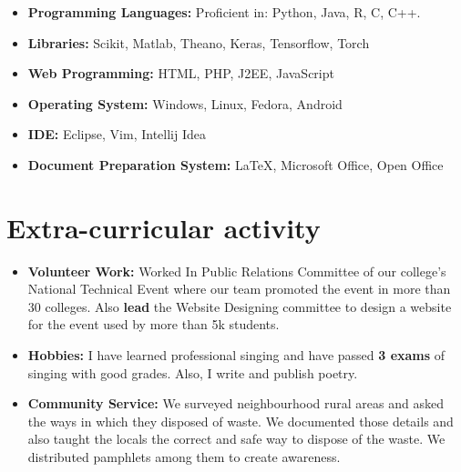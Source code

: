 \documentclass[11pt,a4paper,sans]{moderncv}        %
\begin{document}
\begin{itemize}

\item \textbf{Programming Languages:} Proficient in: Python, Java, R, C, C++.

\vspace{5pt}

\item \textbf{Libraries:} Scikit, Matlab, Theano, Keras, Tensorflow, Torch

\vspace{5pt}

\item \textbf{Web Programming:} HTML, PHP, J2EE, JavaScript

\vspace{5pt}

\item \textbf{Operating System:} Windows, Linux, Fedora, Android

\vspace{5pt}

\item \textbf{IDE:} Eclipse, Vim, Intellij Idea

\vspace{5pt}

\item \textbf{Document Preparation System:} LaTeX, Microsoft Office, Open Office

\end{itemize}

\section{Extra-curricular activity}

\vspace{5pt}

\begin{itemize}

\item\textbf{Volunteer Work:} Worked In Public Relations Committee of our college's National Technical Event where our team promoted the event in more than 30 colleges. Also \textbf{lead} the Website Designing committee to design a website for the event used by more than 5k students.

\vspace{5pt}

\item\textbf{Hobbies:} I have learned professional singing and have passed \textbf{3 exams} of singing with good grades. Also, I write and publish poetry.

\vspace{5pt}

\item\textbf{Community Service:} We surveyed neighbourhood rural areas and asked the ways in which they disposed of waste. We documented those details and also taught the locals the correct and safe way to dispose of the waste. We distributed pamphlets among them to create awareness.

\end{itemize}
\end{document}
